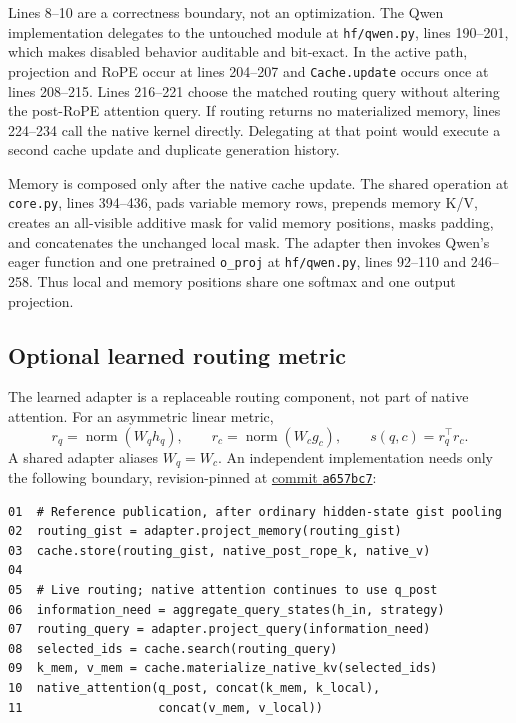 \documentclass[11pt]{article}
\begin{document}
Lines 8--10 are a correctness boundary, not an optimization. The Qwen implementation delegates
to the untouched module at \texttt{hf/qwen.py}, lines 190--201, which makes disabled behavior
auditable and bit-exact. In the active path, projection and RoPE occur at lines 204--207 and
\texttt{Cache.update} occurs once at lines 208--215. Lines 216--221 choose the matched routing
query without altering the post-RoPE attention query. If routing returns no materialized memory,
lines 224--234 call the native kernel directly. Delegating at that point would execute a
second cache update and duplicate generation history.

Memory is composed only after the native cache update. The shared operation at
\texttt{core.py}, lines 394--436, pads variable memory rows, prepends memory K/V, creates an
all-visible additive mask for valid memory positions, masks padding, and concatenates the
unchanged local mask. The adapter then invokes Qwen's eager function and one pretrained
\texttt{o\_proj} at \texttt{hf/qwen.py}, lines 92--110 and 246--258. Thus local and memory
positions share one softmax and one output projection.

\subsection{Optional learned routing metric}

The learned adapter is a replaceable routing component, not part of native attention. For an
asymmetric linear metric,
\begin{equation}
r_q=\operatorname{norm}(W_q h_q),\qquad
r_c=\operatorname{norm}(W_c g_c),\qquad s(q,c)=r_q^\top r_c.
\end{equation}
A shared adapter aliases $W_q=W_c$. An independent implementation needs only the following
boundary, revision-pinned at \href{https://github.com/einnovator/pdattention/tree/a657bc7}{commit
\texttt{a657bc7}}:

\begin{verbatim}
01  # Reference publication, after ordinary hidden-state gist pooling
02  routing_gist = adapter.project_memory(routing_gist)
03  cache.store(routing_gist, native_post_rope_k, native_v)
04
05  # Live routing; native attention continues to use q_post
06  information_need = aggregate_query_states(h_in, strategy)
07  routing_query = adapter.project_query(information_need)
08  selected_ids = cache.search(routing_query)
09  k_mem, v_mem = cache.materialize_native_kv(selected_ids)
10  native_attention(q_post, concat(k_mem, k_local),
11                   concat(v_mem, v_local))
\end{verbatim}
\end{document}
